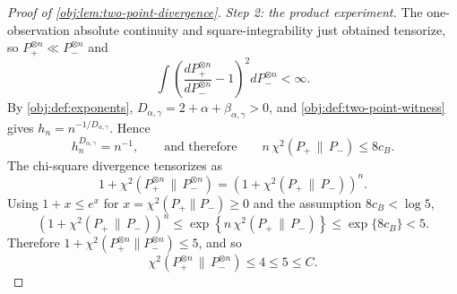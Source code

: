 \begin{proof}[Proof of \cref{obj:lem:two-point-divergence}]
\emph{Step 2: the product experiment.}  The one-observation absolute continuity and square-integrability just obtained tensorize, so \(P_+^{\otimes n}\ll P_-^{\otimes n}\) and
\[
\int \left(\frac{dP_+^{\otimes n}}{dP_-^{\otimes n}}-1\right)^2 dP_-^{\otimes n}<\infty .
\]
By \cref{obj:def:exponents}, \(D_{\alpha,\gamma}=2+\alpha+\beta_{\alpha,\gamma}>0\), and \cref{obj:def:two-point-witness} gives \(h_n=n^{-1/D_{\alpha,\gamma}}\).  Hence
\[
h_n^{D_{\alpha,\gamma}}=n^{-1},
\qquad\text{and therefore}\qquad
n\,\chi^2(P_+\,\|\,P_-)
\le 8c_B .
\]
The chi-square divergence tensorizes as
\[
1+\chi^2(P_+^{\otimes n}\,\|\,P_-^{\otimes n})
 =
 \left(1+\chi^2(P_+\,\|\,P_-)\right)^n .
\]
Using \(1+x\le e^x\) for \(x=\chi^2(P_+\|P_-)\ge0\) and the assumption \(8c_B<\log5\),
\[
\left(1+\chi^2(P_+\,\|\,P_-)\right)^n
 \le \exp\left\{n\,\chi^2(P_+\,\|\,P_-)\right\}
 \le \exp\{8c_B\}
 < 5 .
\]
Therefore \(1+\chi^2(P_+^{\otimes n}\|P_-^{\otimes n})\le5\), and so
\[
\chi^2(P_+^{\otimes n}\,\|\,P_-^{\otimes n})\le4\le 5\le C .
\]
\end{proof}

